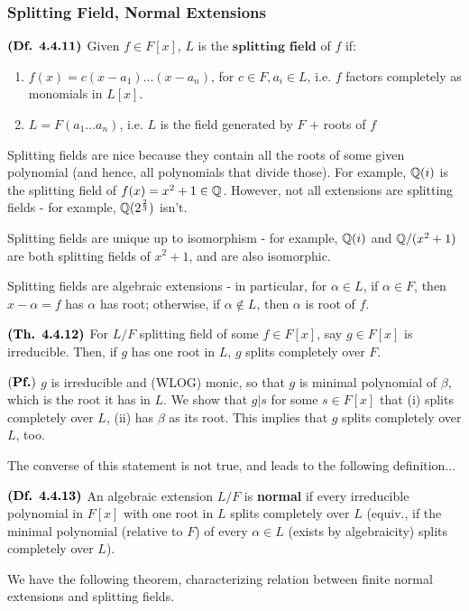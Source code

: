 \documentclass{article}
\begin{document}
\subsubsection*{Splitting Field, Normal Extensions}
$\textbf{(Df. 4.4.11)}$ Given $f \in F[x]$, $L$ is the $\textbf{splitting field}$ of $f$ if:
\begin{enumerate}
    \item $f(x) = c(x - a_1)...(x - a_n)$, for $c \in F, a_i \in L$, i.e. $f$ factors completely as monomials in $L[x]$.
    \item $L = F(a_1...a_n)$, i.e. $L$ is the field generated by $F$ + roots of $f$
\end{enumerate}

 Splitting fields are nice because they contain all the roots of some given polynomial (and hence, all polynomials that divide those). For example, $\mathbb{Q}(i)$ is the splitting field of $f(x) = x^2 + 1 \in \mathbb{Q}$. However, not all extensions are splitting fields - for example, $\mathbb{Q}(2^{\frac{2}{3}})$ isn't.

 Splitting fields are unique up to isomorphism - for example, $\mathbb{Q}(i)$ and $\mathbb{Q}/(x^2+1)$ are both splitting fields of $x^2+1$, and are also isomorphic.

 Splitting fields are algebraic extensions - in particular, for $\alpha \in L$, if $\alpha \in F$, then $x - \alpha = f$ has $\alpha$ has root; otherwise, if $\alpha \notin L$, then $\alpha$ is root of $f$.

 $\textbf{(Th. 4.4.12)}$ For $L/F$ splitting field of some $f \in F[x]$, say $g \in F[x]$ is irreducible. Then, if $g$ has one root in $L$, $g$ splits completely over $F$.

 $(\textbf{Pf.})$ $g$ is irreducible and (WLOG) monic, so that $g$ is minimal polynomial of $\beta$, which is the root it has in $L$. We show that $g|s$ for some $s \in F[x]$ that (i) splits completely over $L$, (ii) has $\beta$ as its root. This implies that $g$ splits completely over $L$, too.

 The converse of this statement is not true, and leads to the following definition...

 $\textbf{(Df. 4.4.13)}$ An algebraic extension $L/F$ is \textbf{normal} if every irreducible polynomial in $F[x]$ with one root in $L$ splits completely over $L$ (equiv., if the minimal polynomial (relative to $F$) of every $\alpha \in L$ (exists by algebraicity) splits completely over $L$).

 We have the following theorem, characterizing relation between finite normal extensions and splitting fields.
\end{document}
